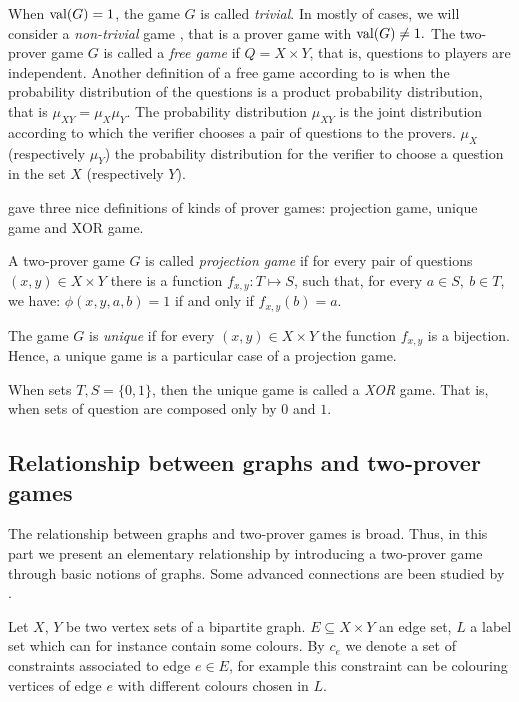 When $\mathrm{val} (G)=1$, the game $G$ is called \textit{trivial}. In mostly of cases, we will consider a \textit{non-trivial} game ,
that is a prover game with $\mathrm{val} (G) \neq 1.$
The two-prover game $G$ is called a \textit{free game} if $Q=X \times Y$, that is, questions to players are  independent. Another definition of a free game according to \cite*{barak2009strong}
is when  the probability  distribution of the questions is a product probability  distribution, that is $\mu_{XY}=\mu_X \mu_Y.$
The probability distribution $\mu_{XY}$ is  the joint distribution according to which the verifier chooses a pair of questions to the provers. $\mu_X$ (respectively  $\mu_Y$) the probability distribution for the verifier to choose a question in the set $X$ (respectively $Y$).

\cite{raz2010parallel} gave three nice definitions of kinds of prover games: projection game, unique game and XOR game.

A two-prover game $G$ is called \textit{projection game} if for every pair of questions $(x,y) \in X \times Y$ there is a function $f_{x,y}: T \longmapsto S$, such that, for every $a\in S, \ b\in T$, we have: $\phi(x,y,a,b)=1$ if and only if $f_{x,y}(b)=a.$ 

The game $G$ is \textit{unique} if for every $(x,y) \in X \times Y$ the function $f_{x,y}$ is a bijection. Hence, a unique game is a particular case of a projection game. 

When sets $T, S = \{0, 1\}$, then the unique game is called a \textit{XOR} game. That is, when sets of question are composed only by $0$ and $1.$

\subsection{Relationship between graphs and two-prover games} \label{expander}

The relationship between graphs and two-prover games is broad. Thus, in this part we present an elementary  relationship by introducing a two-prover game through basic notions of graphs. Some advanced connections are been studied by
\cite*{laekhanukit2014parameters,tamaki2015parallel,dinur2016multiplayer}.

Let $X$, $Y$ be two vertex sets of a bipartite graph. $E\subseteq X \times Y$ an edge set, $L$ a label set which can for instance contain some colours. By $c_e$ we denote a set of constraints associated to edge $e \in E$, for example  this constraint can be colouring vertices of edge $e$ with different colours chosen in $L$.

